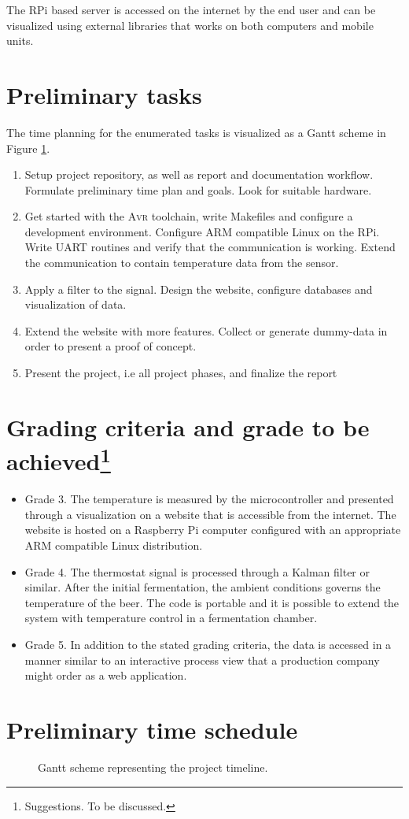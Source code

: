 \documentclass[10pt]{article}
\newcommand{\AVR}{\textsc{Avr}\xspace}
\begin{document}
The RPi based server is accessed on the internet by the end user and can be visualized using external libraries that works on both computers and mobile units.
\newpage
\section*{Preliminary tasks}%
\label{sec:preliminary_tasks}
The time planning for the enumerated tasks is visualized as a Gantt scheme in Figure \ref{fig:gantt}.
\begin{enumerate}
  \item
Setup project repository, as well as report and documentation workflow. Formulate preliminary time plan and goals. Look for suitable hardware.
  \item
Get started with the \AVR toolchain, write Makefiles and configure a development environment. Configure ARM compatible Linux on the RPi. Write UART routines and verify that the communication is working. Extend the communication to contain temperature data from the sensor.
  \item
    Apply a filter to the signal. Design the website, configure databases and visualization of data.
  \item
    Extend the website with more features. Collect or generate dummy-data in order to present a proof of concept.
  \item Present the project, i.e all project phases, and finalize the report
\end{enumerate}
\section*{Grading criteria and grade to be achieved\protect\footnote{Suggestions. To be discussed.}}%
\label{sec:grading_criteria_and_grading_goal}
\begin{itemize}
  \item 
    Grade 3. The temperature is measured by the microcontroller and presented through a visualization on a website that is accessible from the internet. The website is hosted on a Raspberry Pi computer configured with an appropriate ARM compatible Linux distribution.
  \item 
   Grade 4. The thermostat signal is processed through a Kalman filter or similar. After the initial fermentation, the ambient conditions governs the temperature of the beer. The code is portable and it is possible to extend the system with temperature control in a fermentation chamber.
  \item
   Grade 5. In addition to the stated grading criteria, the data is accessed in a manner similar to an interactive process view that a production company might order as a web application.
\end{itemize}
\newpage
\section*{Preliminary time schedule}%
\label{sec:preliminary_time_schedule}


\begin{figure}[ht]
  \centering
  
  \caption{Gantt scheme representing the project timeline.}
  \label{fig:gantt}
\end{figure}
\printbibliography
\end{document}
